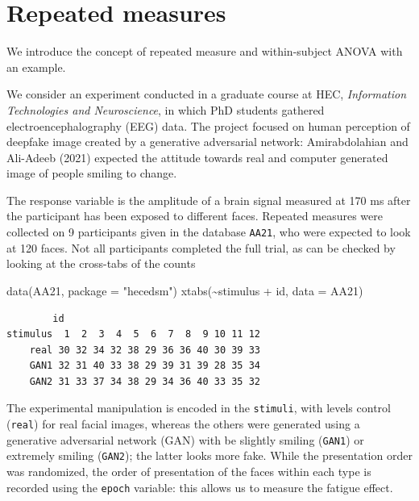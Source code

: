 \documentclass[
  11pt,
  letterpaper,
]{scrbook}
\newenvironment{Shaded}{\begin{snugshade}}{\end{snugshade}}
\newcommand{\AttributeTok}[1]{\textcolor[rgb]{0.40,0.45,0.13}{#1}}
\newcommand{\FunctionTok}[1]{\textcolor[rgb]{0.28,0.35,0.67}{#1}}
\newcommand{\NormalTok}[1]{\textcolor[rgb]{0.00,0.23,0.31}{#1}}
\newcommand{\SpecialCharTok}[1]{\textcolor[rgb]{0.37,0.37,0.37}{#1}}
\newcommand{\StringTok}[1]{\textcolor[rgb]{0.13,0.47,0.30}{#1}}
\theoremstyle{definition}
\theoremstyle{remark}
\begin{document}
\hypertarget{repeated-measures}{%
\section{Repeated measures}\label{repeated-measures}}

We introduce the concept of repeated measure and within-subject ANOVA
with an example.

We consider an experiment conducted in a graduate course at HEC,
\emph{Information Technologies and Neuroscience}, in which PhD students
gathered electroencephalography (EEG) data. The project focused on human
perception of deepfake image created by a generative adversarial
network: Amirabdolahian and Ali-Adeeb (2021) expected the attitude
towards real and computer generated image of people smiling to change.

The response variable is the amplitude of a brain signal measured at 170
ms after the participant has been exposed to different faces. Repeated
measures were collected on 9 participants given in the database
\texttt{AA21}, who were expected to look at 120 faces. Not all
participants completed the full trial, as can be checked by looking at
the cross-tabs of the counts

\begin{Shaded}
\begin{Highlighting}[]
\FunctionTok{data}\NormalTok{(AA21, }\AttributeTok{package =} \StringTok{"hecedsm"}\NormalTok{)}
\FunctionTok{xtabs}\NormalTok{(}\SpecialCharTok{\textasciitilde{}}\NormalTok{stimulus }\SpecialCharTok{+}\NormalTok{ id, }\AttributeTok{data =}\NormalTok{ AA21)}
\end{Highlighting}
\end{Shaded}

\begin{verbatim}
        id
stimulus  1  2  3  4  5  6  7  8  9 10 11 12
    real 30 32 34 32 38 29 36 36 40 30 39 33
    GAN1 32 31 40 33 38 29 39 31 39 28 35 34
    GAN2 31 33 37 34 38 29 34 36 40 33 35 32
\end{verbatim}

The experimental manipulation is encoded in the \texttt{stimuli}, with
levels control (\texttt{real}) for real facial images, whereas the
others were generated using a generative adversarial network (GAN) with
be slightly smiling (\texttt{GAN1}) or extremely smiling
(\texttt{GAN2}); the latter looks more fake. While the presentation
order was randomized, the order of presentation of the faces within each
type is recorded using the \texttt{epoch} variable: this allows us to
measure the fatigue effect.
\end{document}
